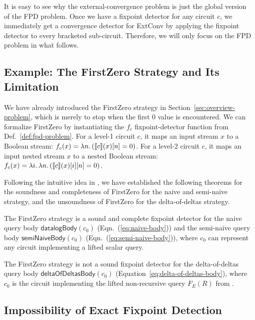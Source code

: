 It is easy to see why the external-convergence problem is just the global version of the FPD problem. Once we have a fixpoint detector for any circuit $c$, we immediately get a convergence detector for ExtConv by applying the fixpoint detector to every bracketed sub-circuit. Therefore, we will only focus on the FPD problem in
what follows.


\subsection{Example: The FirstZero Strategy and Its Limitation}\label{sec:fpd-firstzero}

We have already introduced the FirstZero strategy in Section~\ref{sec:overview-problem}, which is
merely to stop
when the first $0$ value is encountered. 
We can formalize FirstZero by instantiating the $f_c$ fixpoint-detector function 
from
Def.~\ref{def:fpd-problem}. For a level-1 circuit $c$, it maps an input stream $x$ to a Boolean stream: $f_c(x) = \lambda n.\, (\llbracket c \rrbracket(x)[n] = 0)$. For a level-2 circuit $c$, it maps an input nested stream $x$ to a nested Boolean stream: $f_c(x) = \lambda i.\, \lambda n.\, (\llbracket c \rrbracket(x)[i][n] = 0)$.

Following the intuitive idea in , we have established the following theorems for 
the soundness and completeness of FirstZero for the naive and semi-naive strategy, and the unsoundness of FirstZero for the delta-of-deltas strategy.

\begin{theorem}\label{thm:firstzero-valid}
    The FirstZero strategy is a sound and complete fixpoint detector for the naive query body $\mathsf{datalogBody}(c_0)$ (Eqn.~(\ref{eq:naive-body})) and the semi-naive query body $\mathsf{semiNaiveBody}(c_0)$ (Eqn.~(\ref{eq:semi-naive-body})), where $c_0$ can represent any circuit implementing a lifted scalar query.
\end{theorem}

\begin{theorem}\label{thm:firstzero-counterexample}
    The FirstZero strategy is not a sound fixpoint detector for the delta-of-deltas query body $\mathsf{deltaOfDeltasBody}(c_0)$ (Equation~\ref{eq:delta-of-deltas-body}), where $c_0$ is the circuit implementing the lifted non-recursive query $F_E(R)$ from .
\end{theorem}

\subsection{Impossibility of Exact Fixpoint Detection}\label{sec:fpd-undecidability}

